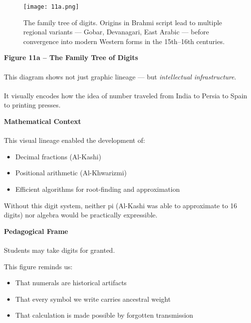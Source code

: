 \documentclass[9pt]{article}
\begin{document}
\begin{figure}[H]
  \centering
  \texttt{[image: 11a.png]}
  \caption{The family tree of digits. Origins in Brahmi script lead to multiple regional variants — Gobar, Devanagari, East Arabic — before convergence into modern Western forms in the 15th–16th centuries.}
\end{figure}


\vspace{1em}

\textbf{Figure 11a – The Family Tree of Digits} \\\\
This diagram shows not just graphic lineage — but \textit{intellectual infrastructure}. \\\\
It visually encodes how the idea of number traveled from India to Persia to Spain to printing presses.

\vspace{1em}

\textbf{Mathematical Context} \\\\
This visual lineage enabled the development of:
\begin{itemize}
    \item Decimal fractions (Al-Kashi)
    \item Positional arithmetic (Al-Khwarizmi)
    \item Efficient algorithms for root-finding and approximation
\end{itemize}

Without this digit system, neither pi (Al-Kashi was able to approximate to 16 digits) nor algebra would be practically expressible.

\vspace{1em}

\textbf{Pedagogical Frame} \\\\
Students may take digits for granted.

This figure reminds us:
\begin{itemize}
    \item That numerals are historical artifacts
    \item That every symbol we write carries ancestral weight
    \item That calculation is made possible by forgotten transmission
\end{itemize}

\vspace{1em}
\end{document}
